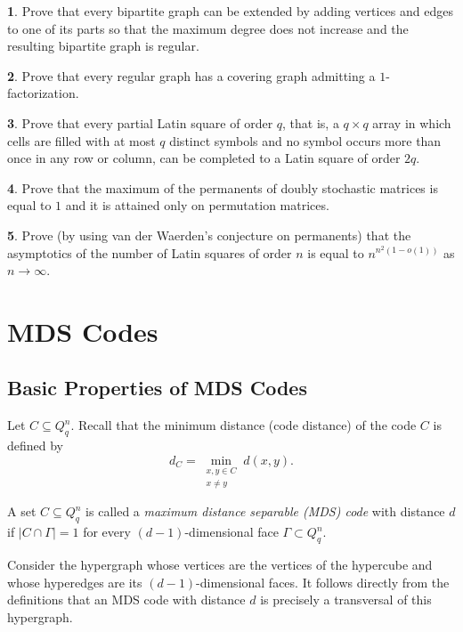 \documentclass[11pt]{article}
\theoremstyle{definition}
\newtheorem{exercise}{\quad}
\begin{document}
{{{\begin{exercise}\cite{Lovasz}
Prove that every bipartite graph can be extended by adding vertices and
edges to one of its parts so that the maximum degree does not increase
and the resulting bipartite graph is regular.
\end{exercise}

\begin{exercise}
Prove that every regular graph has a covering graph admitting a
$1$-factorization.
\end{exercise}

\begin{exercise}
Prove that every partial Latin square of order $q$, that is, a
$q\times q$ array in which  cells are filled with at most $q$
distinct symbols and no symbol occurs more than once in any row or
column, can be completed to a Latin square of order $2q$.
\end{exercise}

\begin{exercise}
Prove that the maximum of the permanents of doubly stochastic matrices is equal to $1$ and it is attained only on permutation matrices.
\end{exercise}

\begin{exercise}
Prove (by using van der Waerden's conjecture on permanents)  that the asymptotics  of the number of Latin squares of order $n$ is equal to $n^{n^2(1-o(1))}$ as $n\rightarrow \infty$. 
\end{exercise}


\section{MDS Codes }



\subsection{Basic Properties of MDS Codes}\label{MDS}

Let $C\subseteq Q_q^n$. Recall that the minimum distance (code distance) of the code $C$ is
defined by
\[
d_C=\min_{\substack{x,y\in C\\x\neq y}} d(x,y).
\]

A set $C\subseteq Q_q^n$ is called a {\sl maximum distance separable
(MDS) code} with distance $d$ if
$|C\cap\Gamma|=1$
for every $(d-1)$-dimensional face $\Gamma\subset Q_q^n$.

Consider the hypergraph whose vertices are the vertices of the
hypercube and whose hyperedges are its $(d-1)$-dimensional faces.
It follows directly from the definitions that an MDS code with
distance $d$ is precisely a transversal of this hypergraph.

}}}
\end{document}
